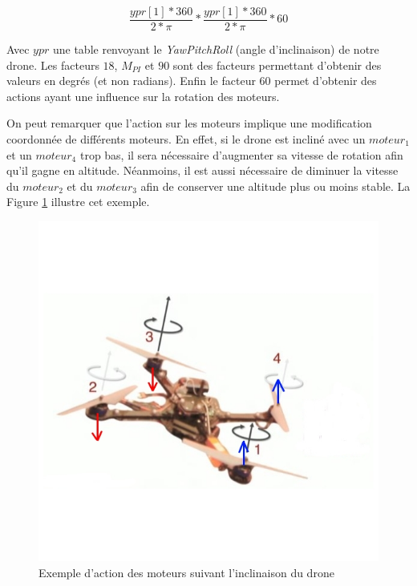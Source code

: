 \documentclass[a4paper,10pt]{report}
\begin{document}
	  \begin{equation}
	    \frac{ypr[1] * 360}{2*\pi} * \frac{ypr[1] * 360}{2*\pi} * 60
	  \end{equation}

	  Avec $ypr$ une table renvoyant le \textit{YawPitchRoll} (angle 
d'inclinaison) de notre drone. Les facteurs $18$, $M_{PI}$ et $90$ sont des 
facteurs permettant d'obtenir des valeurs en degrés (et non radians). Enfin le 
facteur $60$ permet d'obtenir des actions ayant une influence sur la rotation 
des moteurs. 

	  On peut remarquer que l'action sur les moteurs implique une 
modification coordonnée de différents moteurs. En effet, si le drone est 
incliné avec un $moteur_1$ et un $moteur_4$ trop bas, il sera nécessaire 
d'augmenter sa vitesse de rotation afin qu'il gagne en altitude. Néanmoins, il 
est aussi nécessaire de diminuer la vitesse du $moteur_2$ et du $moteur_3$ afin 
de conserver une altitude plus ou moins stable. La Figure 
\ref{inclinaisondrone} illustre cet exemple.

	  \begin{figure}[htbp]
	    \centering
	    \includegraphics[scale = 0.5]{img/quadcopter.jpg}
	    \caption{Exemple d'action des moteurs suivant l'inclinaison du 
drone}
	    \label{inclinaisondrone}
	  \end{figure}
\end{document}
